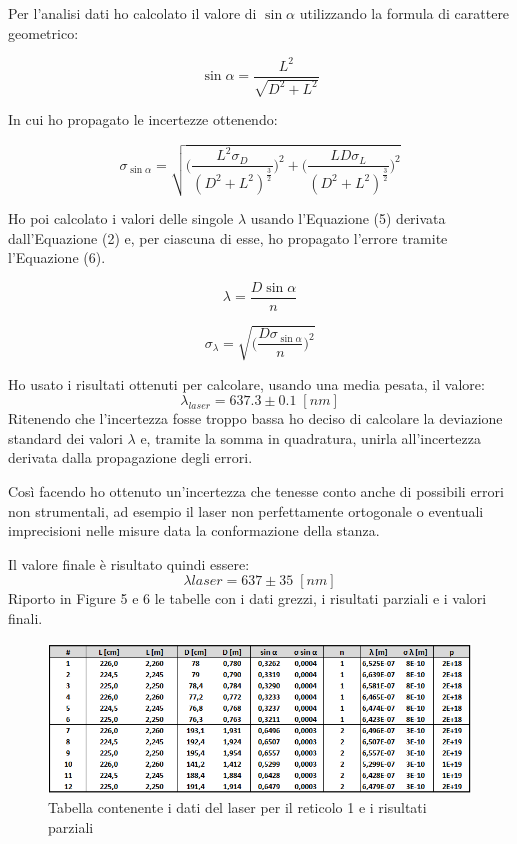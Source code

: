 \documentclass{article}
\begin{document}
\vspace{3mm}

Per l'analisi dati ho calcolato il valore di $\sin \alpha$  utilizzando la formula di carattere geometrico:

\begin{equation}
 \sin \alpha =\frac{L^2}{\sqrt{D^2 + L^2}}
\end{equation}

In cui ho propagato le incertezze ottenendo:

\begin{equation}
\sigma_{\sin \alpha} = \sqrt{\bigg( \frac{L^2 \sigma_D}{(D^2 + L^2)^{\frac{3}{2}}} \bigg)^2 + \bigg( \frac{L  D  \sigma_L}{(D^2 + L^2)^{\frac{3}{2}}} \bigg)^2} 
\end{equation}

Ho poi calcolato i valori delle singole $\lambda$ usando l'Equazione (5) derivata dall'Equazione (2) e, per ciascuna di esse, ho propagato l'errore tramite l'Equazione (6).

\begin{equation}
\lambda = \frac{D \sin \alpha}{n}
\end{equation}

\begin{equation}
\sigma_\lambda = \sqrt{\bigg( \frac{D \sigma_{\sin \alpha}}{n} \bigg)^2}
\end{equation}

Ho usato i risultati ottenuti per calcolare, usando una media pesata, il valore:
\[ \lambda_{laser} = 637.3 \pm 0.1 \; [nm] \]
Ritenendo che l'incertezza fosse troppo bassa ho deciso di calcolare la deviazione standard dei valori $\lambda$ e, tramite la somma in quadratura, unirla all'incertezza derivata dalla propagazione degli errori. 

\vspace{3mm}

Così facendo ho ottenuto un'incertezza che tenesse conto anche di possibili errori non strumentali, ad esempio il laser non perfettamente ortogonale o eventuali imprecisioni nelle misure data la conformazione della stanza. 

\vspace{3mm}

Il valore finale è risultato quindi essere:
\[ \lambda{laser} = 637 \pm 35 \; [nm] \]
Riporto in Figure 5 e 6 le tabelle con i dati grezzi, i risultati parziali e i valori finali.

\begin{figure}[h!]
  \centering
  \includegraphics[width=1\linewidth]{IM tabella laser 1}
  \caption{Tabella contenente i dati del laser per il reticolo 1 e i risultati parziali}
\end{figure}
\end{document}
